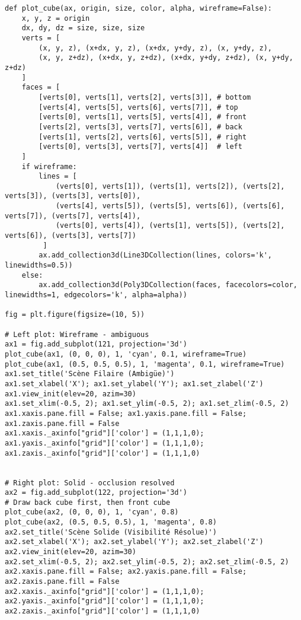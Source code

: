 \documentclass{article}
\begin{document}
{\begin{verbatim}
def plot_cube(ax, origin, size, color, alpha, wireframe=False):
    x, y, z = origin
    dx, dy, dz = size, size, size
    verts = [
        (x, y, z), (x+dx, y, z), (x+dx, y+dy, z), (x, y+dy, z),
        (x, y, z+dz), (x+dx, y, z+dz), (x+dx, y+dy, z+dz), (x, y+dy, z+dz)
    ]
    faces = [
        [verts[0], verts[1], verts[2], verts[3]], # bottom
        [verts[4], verts[5], verts[6], verts[7]], # top
        [verts[0], verts[1], verts[5], verts[4]], # front
        [verts[2], verts[3], verts[7], verts[6]], # back
        [verts[1], verts[2], verts[6], verts[5]], # right
        [verts[0], verts[3], verts[7], verts[4]]  # left
    ]
    if wireframe:
        lines = [
            (verts[0], verts[1]), (verts[1], verts[2]), (verts[2], verts[3]), (verts[3], verts[0]),
            (verts[4], verts[5]), (verts[5], verts[6]), (verts[6], verts[7]), (verts[7], verts[4]),
            (verts[0], verts[4]), (verts[1], verts[5]), (verts[2], verts[6]), (verts[3], verts[7])
         ]
        ax.add_collection3d(Line3DCollection(lines, colors='k', linewidths=0.5))
    else:
        ax.add_collection3d(Poly3DCollection(faces, facecolors=color, linewidths=1, edgecolors='k', alpha=alpha))

fig = plt.figure(figsize=(10, 5))

# Left plot: Wireframe - ambiguous
ax1 = fig.add_subplot(121, projection='3d')
plot_cube(ax1, (0, 0, 0), 1, 'cyan', 0.1, wireframe=True)
plot_cube(ax1, (0.5, 0.5, 0.5), 1, 'magenta', 0.1, wireframe=True)
ax1.set_title('Scène Filaire (Ambigüe)')
ax1.set_xlabel('X'); ax1.set_ylabel('Y'); ax1.set_zlabel('Z')
ax1.view_init(elev=20, azim=30)
ax1.set_xlim(-0.5, 2); ax1.set_ylim(-0.5, 2); ax1.set_zlim(-0.5, 2)
ax1.xaxis.pane.fill = False; ax1.yaxis.pane.fill = False; ax1.zaxis.pane.fill = False
ax1.xaxis._axinfo["grid"]['color'] = (1,1,1,0); ax1.yaxis._axinfo["grid"]['color'] = (1,1,1,0); ax1.zaxis._axinfo["grid"]['color'] = (1,1,1,0)


# Right plot: Solid - occlusion resolved
ax2 = fig.add_subplot(122, projection='3d')
# Draw back cube first, then front cube
plot_cube(ax2, (0, 0, 0), 1, 'cyan', 0.8)
plot_cube(ax2, (0.5, 0.5, 0.5), 1, 'magenta', 0.8)
ax2.set_title('Scène Solide (Visibilité Résolue)')
ax2.set_xlabel('X'); ax2.set_ylabel('Y'); ax2.set_zlabel('Z')
ax2.view_init(elev=20, azim=30)
ax2.set_xlim(-0.5, 2); ax2.set_ylim(-0.5, 2); ax2.set_zlim(-0.5, 2)
ax2.xaxis.pane.fill = False; ax2.yaxis.pane.fill = False; ax2.zaxis.pane.fill = False
ax2.xaxis._axinfo["grid"]['color'] = (1,1,1,0); ax2.yaxis._axinfo["grid"]['color'] = (1,1,1,0); ax2.zaxis._axinfo["grid"]['color'] = (1,1,1,0)


\end{verbatim}}
\end{document}
